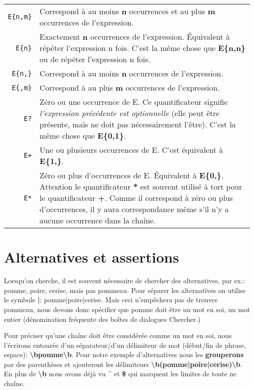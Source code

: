 \noindent\begin{tabular}{Rp{113mm}}
\toprule
\verb|E{n,m}| & Correspond à au moins \textbf{n} occurrences et au plus \textbf{m} occurrences de l'expression.\\
\verb|E{n}| & Exactement \textbf{n} occurrences de l'expression. Équivalent à répéter l'expression n fois. C'est la même chose que \textbf{E\{n,n\}} ou de répéter l'expression n fois.\\
\verb|E{n,}| & Correspond à au moins \textbf{n} occurrences de l'expression.\\
\verb|E{,m}| & Correspond à au plus \textbf{m} occurrences de l'expression.\\
\verb|E?| & Zéro ou une occurrence de E. Ce quantificateur signifie 
\emph{l'expression précédente est optionnelle} (elle peut être présente, mais ne doit pas nécessairement l'être). C'est la même chose que \textbf{E\{0,1\}}.\\
\verb|E+| & Une ou plusieurs occurrences de E. C'est équivalent à \textbf{E\{1,\}}.\\
\verb|E*| & Zéro ou plus d'occurrences de E. Équivalent à \textbf{E\{0,\}}. Attention le quantificateur \textbf{*} est souvent utilisé à tort pour le quantificateur \textbf{+}. Comme il correspond à zéro ou plus d'occurrences, il y aura correspondance même s'il n'y a  aucune occurrence dans la chaîne.\\
\bottomrule
\end{tabular}
\smallskip

\section{Alternatives et assertions}

Lorsqu'on cherche, il est souvent nécessaire de chercher des alternatives, par ex.: pomme, poire, cerise, mais pas pommeau. Pour séparer les alternatives on utilise le symbole \textbf{|}: pomme|poire|cerise. Mais ceci n'empêchera pas de trouver pommeau, nous devons donc spécifier que pomme doit être un mot en soi, un mot entier (dénomination fréquente des boîtes de dialogues \og Chercher\fg.)

Pour préciser qu'une chaîne doit être considérée comme un mot en soi, nous l'écrirons entourée d'un séparateur/d'un délimiteur de mot (début/fin de phrase, espace): \textbf{\textbackslash{}bpomme\textbackslash{}b}. Pour notre exemple d'alternatives nous les \textbf{grouperons} par des parenthèses et ajouteront les délimiteurs \textbf{\textbackslash{}b(pomme|poire|cerise)\textbackslash{}b}. En plus de \textbf{\textbackslash{}b} nous avons déjà vu \textbf{\^{}} et \textbf{\$} qui marquent les limites de toute ne chaîne.

